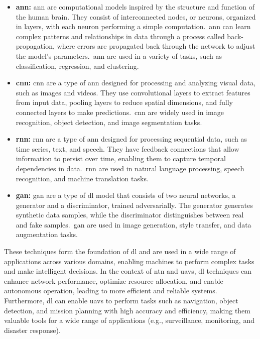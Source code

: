 \begin{itemize}
  \item \textbf{\gls{ann}:} \gls{ann} are computational models inspired by the structure and function of the human brain. They consist of interconnected nodes, or neurons, organized in layers, with each neuron performing a simple computation.\ \gls{ann} can learn complex patterns and relationships in data through a process called back-propagation, where errors are propagated back through the network to adjust the model's parameters.\ \gls{ann} are used in a variety of tasks, such as classification, regression, and clustering.

  \item \textbf{\gls{cnn}:} \gls{cnn} are a type of \gls{ann} designed for processing and analyzing visual data, such as images and videos. They use convolutional layers to extract features from input data, pooling layers to reduce spatial dimensions, and fully connected layers to make predictions.\ \gls{cnn} are widely used in image recognition, object detection, and image segmentation tasks.

  \item \textbf{\gls{rnn}:} \gls{rnn} are a type of \gls{ann} designed for processing sequential data, such as time series, text, and speech. They have feedback connections that allow information to persist over time, enabling them to capture temporal dependencies in data.\ \gls{rnn} are used in natural language processing, speech recognition, and machine translation tasks.

  \item \textbf{\gls{gan}:} \gls{gan} are a type of \gls{dl} model that consists of two neural networks, a generator and a discriminator, trained adversarially. The generator generates synthetic data samples, while the discriminator distinguishes between real and fake samples.\ \gls{gan} are used in image generation, style transfer, and data augmentation tasks.
\end{itemize}

These techniques form the foundation of \gls{dl} and are used in a wide range of applications across various domains, enabling machines to perform complex tasks and make intelligent decisions. In the context of \gls{ntn} and \glspl{uav}, \gls{dl} techniques can enhance network performance, optimize resource allocation, and enable autonomous operation, leading to more efficient and reliable systems. Furthermore, \gls{dl} can enable \glspl{uav} to perform tasks such as navigation, object detection, and mission planning with high accuracy and efficiency, making them valuable tools for a wide range of applications (e.g., surveillance, monitoring, and disaster response).
